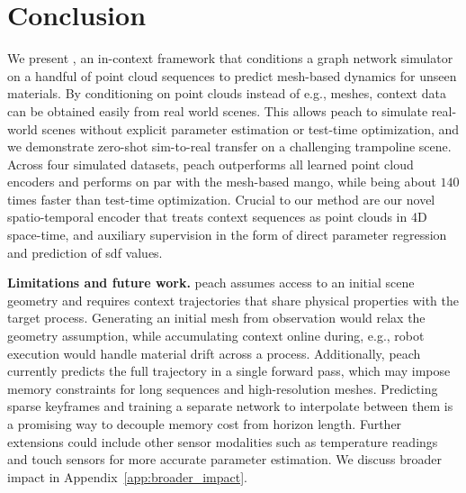 \section{Conclusion}
\label{sec:conclusion}

We present , an in-context framework that conditions a graph network simulator on a handful of point cloud sequences to predict mesh-based dynamics for unseen materials.
By conditioning on point clouds instead of e.g., meshes, context data can be obtained easily from real world scenes.
This allows \gls{peach} to simulate real-world scenes without explicit parameter estimation or test-time optimization, and we demonstrate zero-shot sim-to-real transfer on a challenging trampoline scene.
Across four simulated datasets, \gls{peach} outperforms all learned point cloud encoders and performs on par with the mesh-based \gls{mango}, while being about $140$ times faster than test-time optimization.
Crucial to our method are our novel spatio-temporal encoder that treats context sequences as point clouds in 4D space-time, and auxiliary supervision in the form of direct parameter regression and prediction of \gls{sdf} values.

\textbf{Limitations and future work.} 
\gls{peach} assumes access to an initial scene geometry and requires context trajectories that share physical properties with the target process. 
Generating an initial mesh from observation would relax the geometry assumption, while accumulating context online during, e.g., robot execution would handle material drift across a process.
Additionally, \gls{peach} currently predicts the full trajectory in a single forward pass, which may impose memory constraints for long sequences and high-resolution meshes. 
Predicting sparse keyframes and training a separate network to interpolate between them is a promising way to decouple memory cost from horizon length.
Further extensions could include other sensor modalities such as temperature readings and touch sensors for more accurate parameter estimation.
We discuss broader impact in Appendix~\ref{app:broader_impact}.




